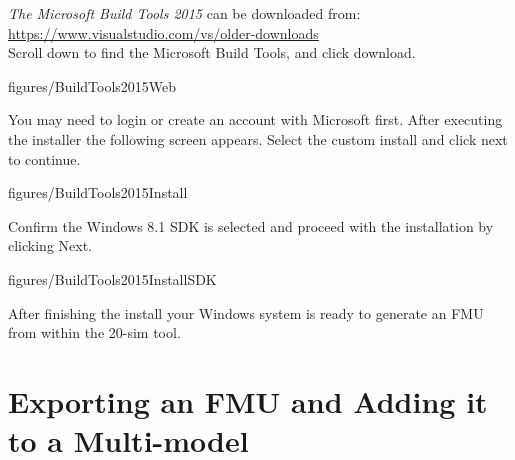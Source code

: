 \documentclass[11pt,a4paper]{../tutorial}
\begin{document}
\begin{instructions}

\item \emph{The Microsoft Build Tools 2015} can be downloaded from: \\ \url{https://www.visualstudio.com/vs/older-downloads}\\ Scroll down to find the Microsoft Build Tools, and click download. 

    \begin{annotation}[width=0.8\linewidth,trim=0 15cm 0 0,clip ]{figures/BuildTools2015Web}
    \end{annotation}


\item You may need to login or create an account with Microsoft first. After executing the installer the following screen appears. Select the custom install and click next to continue.

   \begin{annotation}[width=0.3\linewidth]{figures/BuildTools2015Install}
    \end{annotation}
\newpage

\item Confirm the Windows 8.1 SDK is selected and proceed with the installation by clicking Next. 

   \begin{annotation}[width=0.3\linewidth]{figures/BuildTools2015InstallSDK}
   \end{annotation}

   After finishing the install your Windows system is ready to generate an FMU from within the 20-sim tool. 
\end{instructions}

\newpage

\section{Exporting an FMU and Adding it to a Multi-model}
\end{document}
